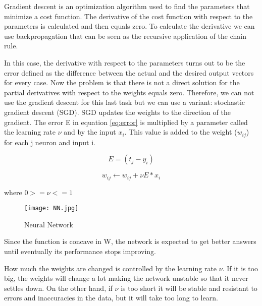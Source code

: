 Gradient descent is an optimization algorithm used to find the parameters  that minimize a cost function. The derivative of the cost function with respect to the parameters is calculated and then equals zero. To calculate the derivative we can use backpropagation that can be seen as the recursive application of the chain rule.

In this case, the derivative with respect to the parameters turns out to be the error defined as the difference between the actual and the desired output vectors for every case. Now the problem is that there is not a direct solution for the partial derivatives with respect to the weights equals zero. Therefore, we can not use the gradient descent for this last task but we can use a variant: stochastic gradient descent (SGD).
SGD updates the weights to the direction of the gradient. The error E in equation \ref{eq:error} is multiplied by a parameter called the learning rate $\nu$ and by the input $x_i$. This value is added to the weight ($w_{ij}$) for each j neuron and input i.

\begin{equation}
\label{eq:error}
E=(t_j - y_i)
\end{equation}

\begin{equation}
\label{eq:weight}
w_{ij} \leftarrow w_{ij}+\nu E * x_i
\end{equation} 
\centerline{where $0>=\nu<=1$ \\}

\begin{figure}
\center
\texttt{[image: NN.jpg]}
\caption{Neural Network}
\label{fig:nn}
\end{figure}

Since the function is concave in W, the network is expected to get better answers until eventually its performance stops improving.

How much the weights are changed is controlled by the learning rate $\nu$. If it is too big, the weights will change a lot  making the network unstable so that it never settles down. On the other hand, if $\nu$ is too short it will be stable and resistant to errors and inaccuracies in the data, but it will take too long to learn. 


